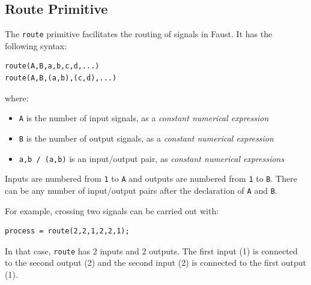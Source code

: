 

\subsection{Route Primitive }

The  \lstinline'route' primitive facilitates the routing of signals in Faust. It has the following syntax:

\begin{lstlisting}
route(A,B,a,b,c,d,...)
route(A,B,(a,b),(c,d),...)
\end{lstlisting}

where:

\begin{itemize} 
\item \lstinline'A' is the number of input signals, as a \textit{constant numerical expression}
\item \lstinline'B' is the number of output signals, as a \textit{constant numerical expression}
\item \lstinline'a,b / (a,b)' is an input/output pair, as \textit{constant numerical expressions}
\end{itemize}

Inputs are numbered from \lstinline'1' to \lstinline'A' and outputs are numbered from \lstinline'1' to \lstinline'B'. There can be any number of input/output pairs after the declaration of \lstinline'A' and \lstinline'B'.

For example, crossing two signals can be carried out with:

\begin{lstlisting}
process = route(2,2,1,2,2,1);
\end{lstlisting}

In that case, \lstinline'route' has 2 inputs and 2 outputs. The first input (1) is connected to the second output (2) and the second input (2) is connected to the first output (1).

